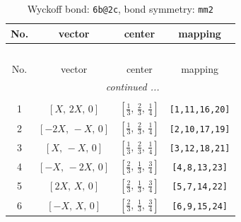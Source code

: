 \documentclass[fleqn,8pt]{jsarticle}
\begin{document}
\begin{longtable}{cccc}
\caption{Wyckoff bond: {\tt 6b@2c}, bond symmetry: {\tt mm2}}
 \\
 \hline \hline
No. & vector & center & mapping \\ \hline \endfirsthead

\multicolumn{3}{l}{\tablename\ \thetable{}} \\
 \hline \hline
No. & vector & center & mapping \\ \hline \endhead

 \hline \hline
\multicolumn{3}{r}{\footnotesize\it continued ...} \\ \endfoot

 \hline \hline
\multicolumn{3}{r}{} \\ \endlastfoot

1 & $\left[ X,\, 2 X,\, 0 \right]$ & $\left[ \frac{1}{3},\, \frac{2}{3},\, \frac{1}{4} \right]$ & {\tt [1,11,16,20]} \\ \hline
2 & $\left[ - 2 X,\, - X,\, 0 \right]$ & $\left[ \frac{1}{3},\, \frac{2}{3},\, \frac{1}{4} \right]$ & {\tt [2,10,17,19]} \\ \hline
3 & $\left[ X,\, - X,\, 0 \right]$ & $\left[ \frac{1}{3},\, \frac{2}{3},\, \frac{1}{4} \right]$ & {\tt [3,12,18,21]} \\ \hline
4 & $\left[ - X,\, - 2 X,\, 0 \right]$ & $\left[ \frac{2}{3},\, \frac{1}{3},\, \frac{3}{4} \right]$ & {\tt [4,8,13,23]} \\ \hline
5 & $\left[ 2 X,\, X,\, 0 \right]$ & $\left[ \frac{2}{3},\, \frac{1}{3},\, \frac{3}{4} \right]$ & {\tt [5,7,14,22]} \\ \hline
6 & $\left[ - X,\, X,\, 0 \right]$ & $\left[ \frac{2}{3},\, \frac{1}{3},\, \frac{3}{4} \right]$ & {\tt [6,9,15,24]} \\
\end{longtable}
\renewcommand{\arraystretch}{1.2}
\end{document}
